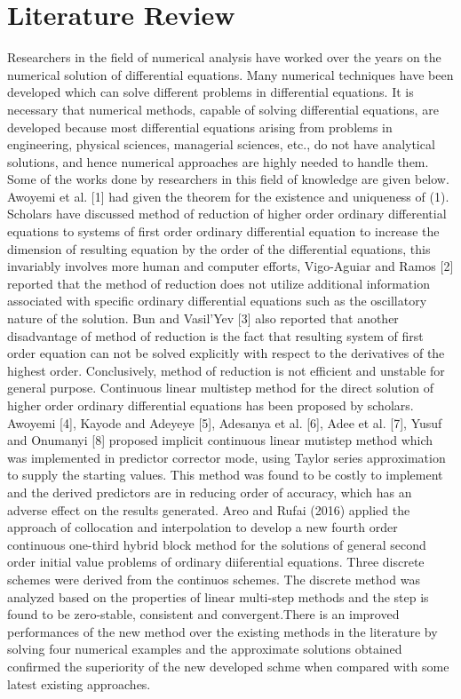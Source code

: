 \documentclass[12pt]{article}
\begin{document}
\section{Literature Review}
\noindent Researchers in the field of numerical analysis have worked over the years on the numerical solution of differential equations. Many numerical techniques have been developed which can solve different problems in differential equations. It is necessary that numerical methods, capable of solving differential equations, are developed because most differential equations arising from problems in engineering, physical sciences, managerial sciences, etc., do not have analytical solutions, and hence numerical approaches are highly needed to handle them. Some of the works done by researchers in this field of knowledge are given below.	
 \noindent Awoyemi et al. [1] had given the theorem for the existence and uniqueness of (1). Scholars have discussed method of reduction of higher order ordinary differential equations to systems of first order ordinary differential equation to increase the dimension of resulting equation by the order of the differential equations, this invariably involves more human and computer efforts, Vigo-Aguiar and Ramos [2] reported that the method of reduction does not utilize additional information associated with specific ordinary differential equations such as the oscillatory nature of the solution. Bun and Vasil’Yev [3] also reported that another disadvantage of method of reduction is the fact that resulting system of first order equation can not be solved explicitly with respect to the derivatives of the highest order. Conclusively, method of reduction is not efficient and unstable for general purpose.
\noindent Continuous linear multistep method for the direct solution of higher order ordinary differential equations has been proposed by scholars. Awoyemi [4], Kayode and Adeyeye [5], Adesanya et al. [6], Adee et al. [7], Yusuf and Onumanyi [8] proposed implicit continuous linear mutistep method which was implemented in predictor corrector mode, using Taylor series approximation to supply the starting values. This method was found to be costly to implement and the derived predictors are in reducing order of accuracy, which has an adverse effect on the results generated.
\noindent Areo and Rufai (2016) applied the approach of collocation and interpolation to develop a new fourth order continuous one-third hybrid block method for the solutions of general second order initial value problems of ordinary diiferential equations. Three discrete schemes were derived from the continuos schemes. The discrete method was analyzed based on the properties of linear multi-step methods and the step is found to be zero-stable, consistent and convergent.There is an improved performances of the new method over the existing methods in the literature by solving four numerical examples and the approximate solutions obtained confirmed the superiority of the new developed schme when compared with some latest existing approaches.
\end{document}
